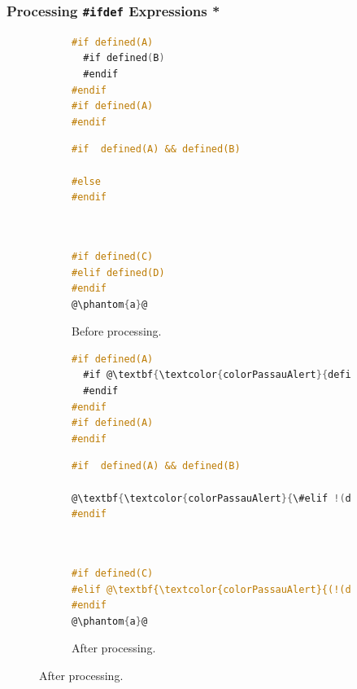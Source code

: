 \documentclass{beamer}
\newcommand\code[1]{\texttt{#1}}
\newcommand\ifdeff[1]{\code{\##1}\xspace}
\newcommand\ifdef[0]{{\upshape\ifdeff{ifdef}}\xspace}
\begin{document}
\begin{frame}[fragile]
\frametitle{Processing \ifdef Expressions \textcolor{colorPassauAlert}{*}}


\begin{figure}[ht]
        \centering
        \small
        \begin{subfigure}[b]{0.4\textwidth}
					\begin{lstlisting}[language=C]
#if defined(A)
  #if defined(B)
  #endif
#endif
#if defined(A)
#endif
					\end{lstlisting}
					\begin{lstlisting}[language=C, firstnumber=5]
#if  defined(A) && defined(B)

#else 
#endif
					\end{lstlisting}
					\begin{lstlisting}[language=C, firstnumber=8]


#if defined(C)
#elif defined(D)
#endif
@\phantom{a}@
					\end{lstlisting}
					\caption{\scriptsize Before processing.}
        \end{subfigure}
        \hfill
        \begin{subfigure}[b]{0.525\textwidth}
					\begin{lstlisting}[language=C]
#if defined(A)
  #if @\textbf{\textcolor{colorPassauAlert}{defined(A) \&\& }}@defined(B)
  #endif
#endif
#if defined(A)
#endif
					\end{lstlisting}
					\begin{lstlisting}[language=C, firstnumber=5]
#if  defined(A) && defined(B)

@\textbf{\textcolor{colorPassauAlert}{\#elif !(defined(A) \&\& defined(B))}}@
#endif
					\end{lstlisting}
					\begin{lstlisting}[language=C, firstnumber=8]


#if defined(C)
#elif @\textbf{\textcolor{colorPassauAlert}{(!(defined(C))) \&\& }}@(defined(D))
#endif
@\phantom{a}@
					\end{lstlisting}
					\caption{\scriptsize After processing.}
        \end{subfigure}   
        
        \label{fig:examples2}
\end{figure}

\end{frame}

  
  
\end{document}
